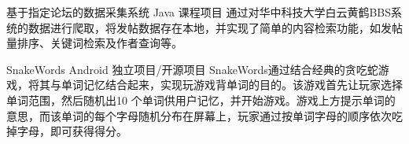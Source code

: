 \documentclass[11pt,a4paper,sans]{moderncv}   %
\begin{document}
\begin{CJK}{UTF8}{gbsn}
{基于指定论坛的数据采集系统}
{Java}
{课程项目}{}
{通过对华中科技大学白云黄鹤BBS系统的数据进行爬取，将发帖数据存在本地，并实现了简单的内容检索功能，如发帖量排序、关键词检索及作者查询等。}
\vspace*{0.2\baselineskip}

{SnakeWords}
{Android}
{独立项目/开源项目}{}
{SnakeWords通过结合经典的贪吃蛇游戏，将其与单词记忆结合起来，实现玩游戏背单词的目的。该游戏首先让玩家选择单词范围，然后随机出10 个单词供用户记忆，并开始游戏。游戏上方提示单词的意思，而该单词的每个字母随机分布在屏幕上，玩家通过按单词字母的顺序依次吃掉字母，即可获得得分。}
\vspace*{0.2\baselineskip}


\renewcommand{\baselinestretch}{1.0}

\closesection{}                   %
\renewcommand{\listitemsymbol}{-} %
\clearpage\end{CJK}
\end{document}
